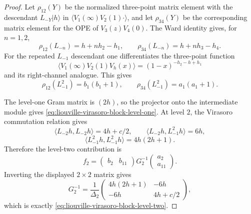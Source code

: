 \begin{proof}
Let \(\rho_{12}(Y)\) be the normalized three-point matrix element with the
descendant \(L_{-Y}|h\rangle\) in
\(\langle V_1(\infty)V_2(1)\cdot\rangle\), and let \(\rho_{34}(Y)\) be the
corresponding matrix element for the OPE of \(V_3(z)V_4(0)\).  The Ward
identity gives, for \(n=1,2\),
\[
  \rho_{12}(L_{-n})=h+n h_2-h_1,\qquad
  \rho_{34}(L_{-n})=h+n h_3-h_4.
\]
For the repeated \(L_{-1}\) descendant one differentiates the three-point
function
\[
  \langle V_1(\infty)V_2(1)V_h(x)\rangle
  =
  (1-x)^{-h_2-h+h_1}
\]
and its right-channel analogue.  This gives
\[
  \rho_{12}(L_{-1}^2)=b_1(b_1+1),\qquad
  \rho_{34}(L_{-1}^2)=a_1(a_1+1).
\]

The level-one Gram matrix is \((2h)\), so the projector onto the
intermediate module gives \eqref{eq:liouville-virasoro-block-level-one}.  At
level \(2\), the Virasoro commutation relation gives
\[
  \langle L_{-2}h,L_{-2}h\rangle=4h+c/2,\qquad
  \langle L_{-2}h,L_{-1}^2h\rangle=6h,
\]
\[
  \langle L_{-1}^2h,L_{-1}^2h\rangle=4h(2h+1).
\]
Therefore the level-two contribution is
\[
  f_2=
  \begin{pmatrix}b_2&b_{11}\end{pmatrix}
  G_2^{-1}
  \begin{pmatrix}a_2\\ a_{11}\end{pmatrix}.
\]
Inverting the displayed \(2\times2\) matrix gives
\[
  G_2^{-1}
  =
  \frac1{\Delta_2}
  \begin{pmatrix}
    4h(2h+1) & -6h\\
    -6h & 4h+c/2
  \end{pmatrix},
\]
which is exactly \eqref{eq:liouville-virasoro-block-level-two}.
\end{proof}

